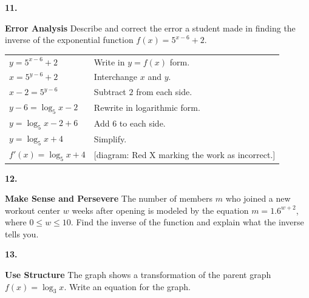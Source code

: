 \documentclass{article}
\newenvironment{practice}[2]{\textbf{#1.}\par}{\par}
\newcommand{\answer}[1]{}
\newcommand{\placeholder}[2]{[#1: #2]}
\begin{document}
\begin{practice}{11}{}
\textbf{Error Analysis} Describe and correct the error a student made in finding the inverse of the exponential function $f(x) = 5^{x-6} + 2$.

\begin{center}
\begin{tabular}{ll}
$y = 5^{x-6} + 2$ & Write in $y = f(x)$ form. \\
$x = 5^{y-6} + 2$ & Interchange $x$ and $y$. \\
$x - 2 = 5^{y-6}$ & Subtract $2$ from each side. \\
$y - 6 = \log_5 x - 2$ & Rewrite in logarithmic form. \\
$y = \log_5 x - 2 + 6$ & Add $6$ to each side. \\
$y = \log_5 x + 4$ & Simplify. \\
$f'(x) = \log_5 x + 4$ & \placeholder{diagram}{Red X marking the work as incorrect.}
\end{tabular}
\end{center}
\answer{}
\end{practice}

\begin{practice}{12}{}
\textbf{Make Sense and Persevere} The number of members $m$ who joined a new workout center $w$ weeks after opening is modeled by the equation $m = 1.6^{w+2}$, where $0 \leq w \leq 10$. Find the inverse of the function and explain what the inverse tells you.
\answer{}
\end{practice}

\begin{practice}{13}{}
\textbf{Use Structure} The graph shows a transformation of the parent graph $f(x) = \log_3 x$. Write an equation for the graph.

\begin{center}
\end{center}
\answer{}
\end{practice}
\end{document}
